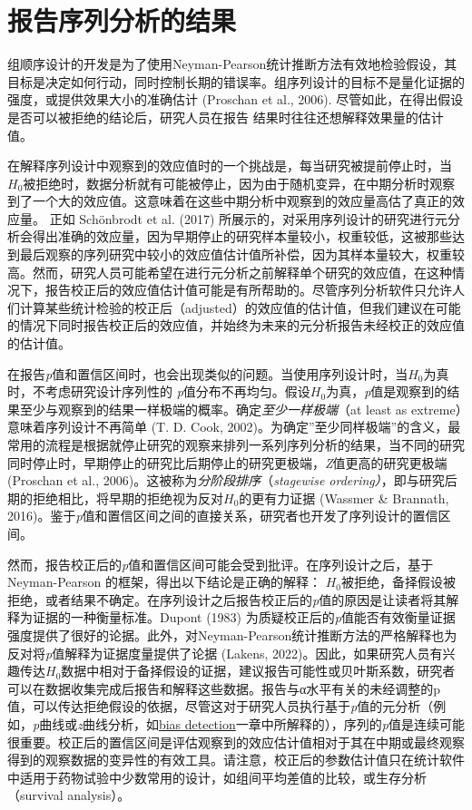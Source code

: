 \documentclass[
  letterpaper,
  DIV=11,
  numbers=noendperiod]{scrreprt}
\begin{document}
\hypertarget{ux62a5ux544aux5e8fux5217ux5206ux6790ux7684ux7ed3ux679c}{%
\section{报告序列分析的结果}\label{ux62a5ux544aux5e8fux5217ux5206ux6790ux7684ux7ed3ux679c}}

组顺序设计的开发是为了使用Neyman-Pearson统计推断方法有效地检验假设，其目标是决定如何行动，同时控制长期的错误率。组序列设计的目标不是量化证据的强度，或提供效果大小的准确估计
(Proschan et al., 2006).
尽管如此，在得出假设是否可以被拒绝的结论后，研究人员在报告
结果时往往还想解释效果量的估计值。

在解释序列设计中观察到的效应值时的一个挑战是，每当研究被提前停止时，当\(H_0\)被拒绝时，数据分析就有可能被停止，因为由于随机变异，在中期分析时观察到了一个大的效应值。这意味着在这些中期分析中观察到的效应量高估了真正的效应量。
正如 Schönbrodt et al. (2017)
所展示的，对采用序列设计的研究进行元分析会得出准确的效应量，因为早期停止的研究样本量较小，权重较低，这被那些达到最后观察的序列研究中较小的效应值估计值所补偿，因为其样本量较大，权重较高。然而，研究人员可能希望在进行元分析之前解释单个研究的效应值，在这种情况下，报告校正后的效应值估计值可能是有所帮助的。尽管序列分析软件只允许人们计算某些统计检验的校正后（adjusted）的效应值的估计值，但我们建议在可能的情况下同时报告校正后的效应值，并始终为未来的元分析报告未经校正的效应值的估计值。

在报告\emph{p}值和置信区间时，也会出现类似的问题。当使用序列设计时，当\(H_0\)为真时，不考虑研究设计序列性的
\emph{p}值分布不再均匀。假设\(H_0\)为真，\emph{p}值是观察到的结果至少与观察到的结果一样极端的概率。确定\emph{至少一样极端}（at
least as extreme）意味着序列设计不再简单 (T. D. Cook,
2002)。为确定''至少同样极端''的含义，最常用的流程是根据就停止研究的观察来排列一系列序列分析的结果，当不同的研究同时停止时，早期停止的研究比后期停止的研究更极端，\emph{Z}值更高的研究更极端
(Proschan et al., 2006)。这被称为\emph{分阶段排序}（\emph{stagewise
ordering）}，即与研究后期的拒绝相比，将早期的拒绝视为反对\(H_0\)的更有力证据
(Wassmer \& Brannath,
2016)。鉴于\emph{p}值和置信区间之间的直接关系，研究者也开发了序列设计的置信区间。

然而，报告校正后的\emph{p}值和置信区间可能会受到批评。在序列设计之后，基于Neyman-Pearson
的框架，得出以下结论是正确的解释：
\(H_0\)被拒绝，备择假设被拒绝，或者结果不确定。在序列设计之后报告校正后的\emph{p}值的原因是让读者将其解释为证据的一种衡量标准。Dupont
(1983)
为质疑校正后的\emph{p}值能否有效衡量证据强度提供了很好的论据。此外，对Neyman-Pearson统计推断方法的严格解释也为反对将\emph{p}值解释为证据度量提供了论据
(Lakens,
2022)。因此，如果研究人员有兴趣传达\(H_0\)数据中相对于备择假设的证据，建议报告可能性或贝叶斯系数，研究者可以在数据收集完成后报告和解释这些数据。报告与α水平有关的未经调整的p值，可以传达拒绝假设的依据，尽管这对于研究人员执行基于\emph{p}值的元分析（例如，\emph{p}曲线或\emph{z}曲线分析，如\protect\hyperlink{bias}{bias
detection}一章中所解释的），序列的\emph{p}值是连续可能很重要。校正后的置信区间是评估观察到的效应估计值相对于其在中期或最终观察得到的观察数据的变异性的有效工具。请注意，校正后的参数估计值只在统计软件中适用于药物试验中少数常用的设计，如组间平均差值的比较，或生存分析（survival
analysis）。
\end{document}
